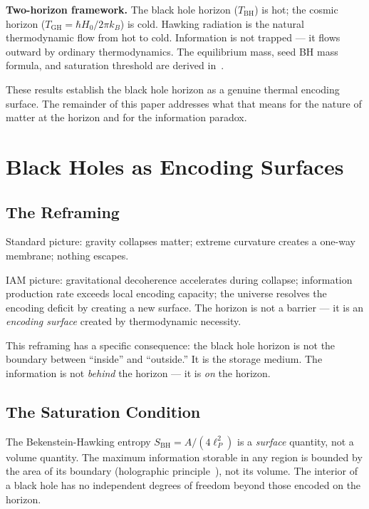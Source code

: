 \documentclass[12pt,letterpaper]{article}
\begin{document}
\textbf{Two-horizon framework.}
The black hole horizon ($T_\text{BH}$) is hot; the cosmic horizon
($T_\text{GH} = \hbar H_0/2\pi k_B$) is cold.
Hawking radiation is the natural thermodynamic flow from hot to cold.
Information is not trapped --- it flows outward by ordinary thermodynamics.
The equilibrium mass, seed BH mass formula, and saturation threshold
are derived in~\cite{MahaffeyBHThermo2026}.

These results establish the black hole horizon as a genuine thermal
encoding surface. The remainder of this paper addresses what that
means for the nature of matter at the horizon and for the
information paradox.

\section{Black Holes as Encoding Surfaces}

\subsection{The Reframing}

Standard picture: gravity collapses matter; extreme curvature
creates a one-way membrane; nothing escapes.

IAM picture: gravitational decoherence accelerates during collapse;
information production rate exceeds local encoding capacity;
the universe resolves the encoding deficit by creating a new surface.
The horizon is not a barrier --- it is an \emph{encoding surface}
created by thermodynamic necessity.

This reframing has a specific consequence: the black hole horizon
is not the boundary between ``inside'' and ``outside.''
It is the storage medium. The information is not \emph{behind}
the horizon --- it is \emph{on} the horizon.

\subsection{The Saturation Condition}

The Bekenstein-Hawking entropy $S_\text{BH} = A/(4\ell_P^2)$
is a \emph{surface} quantity, not a volume quantity.
The maximum information storable in any region is bounded
by the area of its boundary (holographic principle~\cite{tHooft1993,Susskind1995}),
not its volume. The interior of a black hole has no independent
degrees of freedom beyond those encoded on the horizon.
\end{document}
